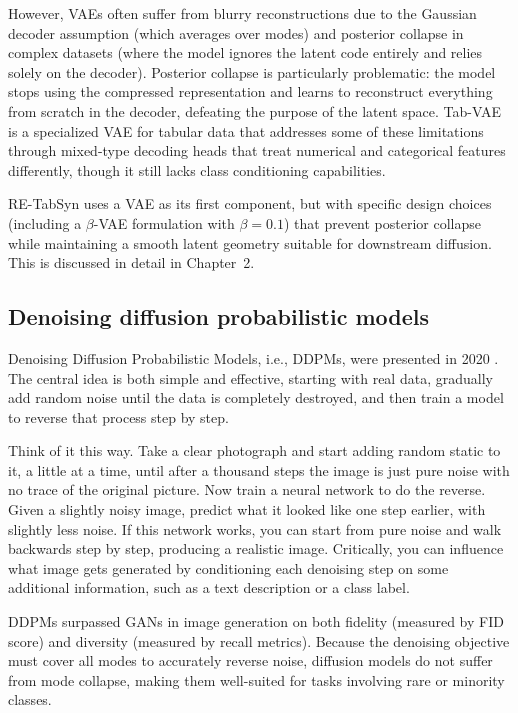 However, VAEs often suffer from blurry reconstructions due to the Gaussian decoder assumption (which averages over modes) and posterior collapse in complex datasets (where the model ignores the latent code entirely and relies solely on the decoder). Posterior collapse is particularly problematic: the model stops using the compressed representation and learns to reconstruct everything from scratch in the decoder, defeating the purpose of the latent space. Tab-VAE \cite{kim2023tabvae} is a specialized VAE for tabular data that addresses some of these limitations through mixed-type decoding heads that treat numerical and categorical features differently, though it still lacks class conditioning capabilities.

RE-TabSyn uses a VAE as its first component, but with specific design choices (including a $\beta$-VAE formulation with $\beta = 0.1$) that prevent posterior collapse while maintaining a smooth latent geometry suitable for downstream diffusion. This is discussed in detail in Chapter~2.

\subsection{Denoising diffusion probabilistic models}

Denoising Diffusion Probabilistic Models, i.e., DDPMs, were presented in 2020 \cite{ho2020ddpm}. The central idea is both simple and effective, starting with real data, gradually add random noise until the data is completely destroyed, and then train a model to reverse that process step by step.

Think of it this way. Take a clear photograph and start adding random static to it, a little at a time, until after a thousand steps the image is just pure noise with no trace of the original picture. Now train a neural network to do the reverse. Given a slightly noisy image, predict what it looked like one step earlier, with slightly less noise. If this network works, you can start from pure noise and walk backwards step by step, producing a realistic image. Critically, you can influence what image gets generated by conditioning each denoising step on some additional information, such as a text description or a class label.

DDPMs surpassed GANs in image generation on both fidelity (measured by FID score) and diversity (measured by recall metrics). Because the denoising objective must cover all modes to accurately reverse noise, diffusion models do not suffer from mode collapse, making them well-suited for tasks involving rare or minority classes.

